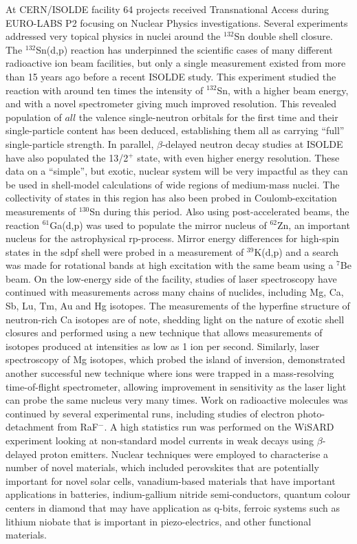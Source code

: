 At CERN/ISOLDE facility 64 projects received Transnational Access during EURO-LABS P2 focusing on Nuclear Physics investigations. Several experiments addressed very topical physics in nuclei around the $^{132}$Sn double shell closure. The $^{132}$Sn(d,p) reaction has underpinned the scientific cases of many different radioactive ion beam facilities, but only a single measurement existed from more than 15 years ago before a recent ISOLDE study. This experiment studied the reaction with around ten times the intensity of $^{132}$Sn, with a higher beam energy, and with a novel spectrometer giving much improved resolution. This revealed population of $all$ the valence single-neutron orbitals for the first time and their single-particle content has been deduced, establishing them all as carrying “full” single-particle strength. In parallel, $\beta$-delayed neutron decay studies at ISOLDE have also populated the 13/2$^+$ state, with even higher energy resolution. These data on a “simple”, but exotic, nuclear system will be very impactful as they can be used in shell-model calculations of wide regions of medium-mass nuclei. The collectivity of states in this region has also been probed in Coulomb-excitation measurements of $^{130}$Sn during this period. Also using post-accelerated beams, the reaction $^{61}$Ga(d,p) was used to populate the mirror nucleus of $^{62}$Zn, an important nucleus for the astrophysical rp-process. Mirror energy differences for high-spin states in the sdpf shell were probed in a measurement of $^{39}$K(d,p) and a search was made for rotational bands at high excitation with the same beam using a $^7$Be beam. On the low-energy side of the facility, studies of laser spectroscopy have continued with measurements across many chains of nuclides, including Mg, Ca, Sb, Lu, Tm, Au and Hg isotopes. The measurements of the hyperfine structure of neutron-rich Ca isotopes are of note, shedding light on the nature of exotic shell closures and performed using a new technique that allows measurements of isotopes produced at intensities as low as 1 ion per second. Similarly, laser spectroscopy of Mg isotopes, which probed the island of inversion, demonstrated another successful new technique where ions were trapped in a mass-resolving time-of-flight spectrometer, allowing improvement in sensitivity as the laser light can probe the same nucleus very many times. Work on radioactive molecules was continued by several experimental runs, including studies of electron photo-detachment from RaF$^-$. A high statistics run was performed on the WiSARD experiment looking at non-standard model currents in weak decays using $\beta$-delayed proton emitters. Nuclear techniques were employed to characterise a number of novel materials, which included perovskites that are potentially important for novel solar cells, vanadium-based materials that have important applications in batteries, indium-gallium nitride semi-conductors, quantum colour centers in diamond that may have application as q-bits, ferroic systems such as lithium niobate that is important in piezo-electrics, and other functional materials.

